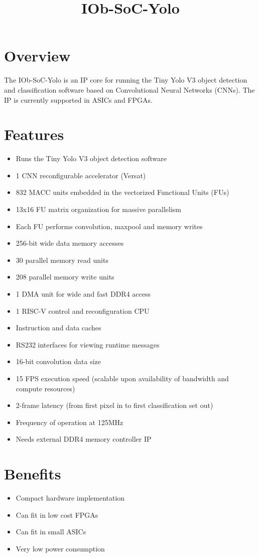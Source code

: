 \documentclass[twocolumn]{iob_pb}
\title{IOb-SoC-Yolo}
\newcommand\BackgroundPic{%
\put(0,0){%
\parbox[b][\paperheight]{\paperwidth}{%
\vfill
\centering
\texttt{[image: bg.png]}%
\vfill
}}}
\begin{document}
\AddToShipoutPicture*{\BackgroundPic}

\section*{\textcolor[rgb]{0,0,0}{Overview}}

The IOb-SoC-Yolo is an IP core for running the Tiny Yolo V3 object detection and
classification software based on Convolutional Neural Networks (CNNs). The IP is
currently supported in ASICs and FPGAs.

\section*{\textcolor[rgb]{0,0,0}{Features}}
\begin{itemize}
\item Runs the Tiny Yolo V3 object detection software
\item 1 CNN reconfigurable accelerator (Versat)
\item 832 MACC units embedded in the vectorized Functional Units (FUs)
\item 13x16 FU matrix organization for massive parallelism
\item Each FU performs convolution, maxpool and memory writes
\item 256-bit wide data memory accesses
\item 30 parallel memory read units
\item 208 parallel memory write units
\item 1 DMA unit for wide and fast DDR4 access 
\item 1 RISC-V control and reconfiguration CPU
\item Instruction and data caches
\item RS232 interfaces for viewing runtime messages
\item 16-bit convolution data size
\item 15 FPS execution speed (scalable upon availability of bandwidth and compute resources)
\item 2-frame latency (from first pixel in to first classification set out)
\item Frequency of operation at 125MHz
\item Needs external DDR4 memory controller IP
\end{itemize}

\section*{\textcolor[rgb]{0,0,0}{Benefits}}
\begin{itemize}
\item Compact hardware implementation
\item Can fit in low cost FPGAs
\item Can fit in small ASICs 
\item Very low power consumption
\end{itemize}
\end{document}
